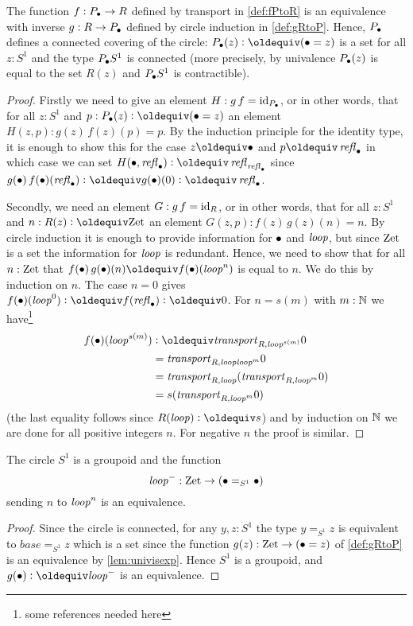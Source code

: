 \begin{lemma}
  \label{lem:univisexp}
  The function $f:P_\bullet\to R$ defined by transport in \cref{def:fPtoR} is an equivalence with inverse $g:R\to P_\bullet$ defined by circle induction in \cref{def:gRtoP}.  Hence, 
$P_\bullet$ defines a connected covering of the circle: $P_\base(z)\defequi (\base=z)$ is a set for all $z:S^1$ and the type $P_\bullet S^1$ is connected (more precisely, by univalence $P_\bullet(z)$ is equal to the set $R(z)$ and $P_\bullet S^1$ is contractible).
\end{lemma}
\begin{proof}
  Firstly we need to give an element $H:g\,f=\mathord{\mathrm{id}}_{P_\bullet}$, or in other words, that for all $z:S^1$ and $p:P_\base(z)\defequi(\base=z)$ an element $H(z,p):g(z)\,f(z)(p)=p$.  By the induction principle for the identity type, it is enough to show this for the case $z\oldequiv\base$ and $p\oldequiv\refl\base$ in which case we can set $H(\base,\refl\base)\defequi\refl{\refl\base}$ since
$g(\base)\,f(\base)(\refl\base)\defequi g(\base)(0)\defequi\refl\base$.

Secondly, we need an element $G:g\,f=\mathord{\mathrm{id}}_{R}$, or in other words, that for all $z:S^1$ and $n:R(z)\defequi\zet$ an element $G(z,p):f(z)\,g(z)(n)=n$.  By circle induction it is enough to provide information for $\bullet$ and $\mathit{loop}$, but since $\mathrm{Zet}$ is a set the information for $\mathit{loop}$ is redundant.  Hence, we need to show that for all $n:\mathrm{Zet}$ that $f(\base)\,g(\base)(n)\oldequiv f(\base)(\Sloop^n)$ is equal to $n$.  We do this by induction on $n$.  The case $n=0$ gives $f(\base)(\Sloop^0)\defequi f(\refl\base)\defequi 0$.  For $n=s(m)$ with $m:\mathbb{N}$ we have\footnote{some references needed here} 
\begin{align*}
  f(\base)(\Sloop^{s(m)})&\defequi\trp_{R,\Sloop^{s(m)}}0\\
  &=\trp_{R,\Sloop \Sloop^{m}}0\\
  &=\trp_{R,\Sloop}(\trp_{R,\Sloop^m}0)\\
  &=s(\trp_{R,\Sloop^m}0)
\end{align*}
 (the last equality follows since $R(\Sloop)\defequi s$) and by induction on $\mathbb{N}$ we are done for all positive integers $n$.  For negative $n$ the proof is similar.
\end{proof}


\begin{corollary}\label{cor:S1groupoid}
  The circle $S^1$ is a groupoid and the function
$$\mathit{loop}^-:\mathrm{Zet}\to(\bullet=_{S^1}\bullet)$$ sending $n$ to $\mathit{loop}^n$ is an equivalence.
\end{corollary}
\begin{proof}
  Since the circle is connected, for any $y,z:S^1$ the type $y=_{S^1}z$ is equivalent to $base=_{S^1}z$ which is a set since the function $g(z):\mathrm{Zet}\to(\bullet=z)$ of \cref{def:gRtoP} is an equivalence by \cref{lem:univisexp}.  Hence $S^1$ is a groupoid, and $g(\base)\defequi\Sloop^-$ is an equivalence.
\end{proof}
